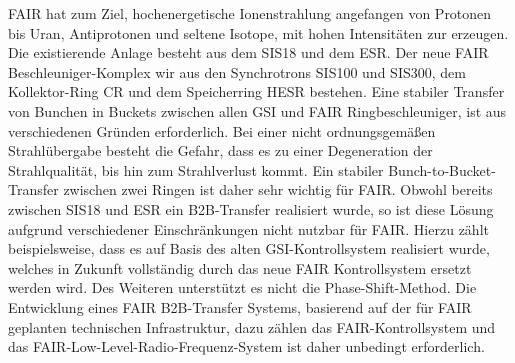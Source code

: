 FAIR hat zum Ziel, hochenergetische Ionenstrahlung angefangen von Protonen bis Uran, Antiprotonen und seltene Isotope, mit hohen Intensit\"aten zur erzeugen. Die existierende Anlage besteht aus dem SIS18 und dem ESR. Der neue FAIR Beschleuniger-Komplex wir aus den Synchrotrons SIS100 und SIS300, dem Kollektor-Ring CR und dem Speicherring HESR bestehen. Eine stabiler Transfer von Bunchen in Buckets zwischen allen GSI und FAIR Ringbeschleuniger, ist aus verschiedenen Gr\"unden erforderlich. Bei einer nicht ordnungsgem\"a\ss{}en Strahl\"ubergabe besteht die Gefahr, dass es zu einer Degeneration der Strahlqualit\"at, bis hin zum Strahlverlust kommt. Ein stabiler Bunch-to-Bucket-Transfer zwischen zwei Ringen ist daher sehr wichtig f\"ur FAIR. Obwohl bereits zwischen SIS18 und ESR ein B2B-Transfer realisiert wurde, so ist diese L\"osung aufgrund verschiedener Einschr\"ankungen nicht nutzbar f\"ur FAIR. Hierzu z\"ahlt beispielsweise, dass es auf Basis des alten GSI-Kontrollsystem realisiert wurde, welches in Zukunft vollst\"andig durch das neue FAIR Kontrollsystem ersetzt werden wird. Des Weiteren unterst\"utzt es nicht die Phase-Shift-Method. Die Entwicklung eines FAIR B2B-Transfer Systems, basierend auf der f\"ur FAIR geplanten technischen Infrastruktur, dazu z\"ahlen das FAIR-Kontrollsystem und das FAIR-Low-Level-Radio-Frequenz-System ist daher unbedingt erforderlich.

